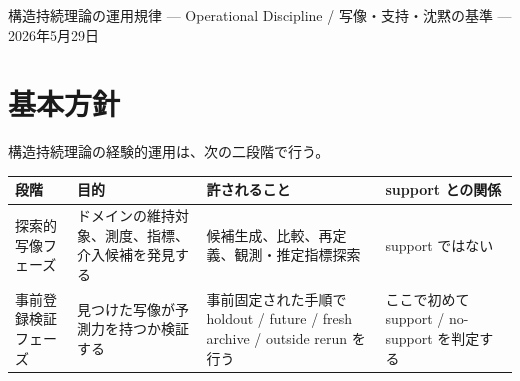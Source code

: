 \documentclass[12pt,a4paper]{article}
\begin{document}
\PaperTitleBlock
  {構造持続理論の運用規律}
  {— Operational Discipline / 写像・支持・沈黙の基準 —}
  {2026年5月29日}

\begin{abstract}
本補論は、構造持続理論を現実ドメインへ適用するときの運用規律をまとめる。中心にあるのは、理論核と写像発見を分けることである。理論核は、事前固定された構造維持問題に対する会計的・代数的制約である。一方、現実ドメインでは、維持対象、構造粒度、測度、段階損失指標、修復指標を探索的に発見する段階がある。この探索は許される。しかし、その同じ探索データ上の説明を support と呼んではならない。

Support と呼べるのは、写像・特徴量・baseline・metric・split・実行手順を凍結した後、holdout / future / fresh archive / outside rerun で、事前に定めた基準を満たした場合に限る。この補論は、その判定語彙を明示する。
\end{abstract}

\section{基本方針}\label{ux57faux672cux65b9ux91dd}

構造持続理論の経験的運用は、次の二段階で行う。

{\def\LTcaptype{table} %
\begin{longtable}[]{@{}
  >{\raggedright\arraybackslash}p{}
  >{\raggedright\arraybackslash}p{}
  >{\raggedright\arraybackslash}p{}
  >{\raggedright\arraybackslash}p{}@{}}
\toprule\noalign{}
\begin{minipage}[b]{\linewidth}\raggedright
段階
\end{minipage} & \begin{minipage}[b]{\linewidth}\raggedright
目的
\end{minipage} & \begin{minipage}[b]{\linewidth}\raggedright
許されること
\end{minipage} & \begin{minipage}[b]{\linewidth}\raggedright
support との関係
\end{minipage} \\
\midrule\noalign{}
\endhead
\bottomrule\noalign{}
\endlastfoot
探索的写像フェーズ & ドメインの維持対象、測度、指標、介入候補を発見する & 候補生成、比較、再定義、観測・推定指標探索 & support ではない \\
事前登録検証フェーズ & 見つけた写像が予測力を持つか検証する & 事前固定された手順で holdout / future / fresh archive / outside rerun を行う & ここで初めて support / no-support を判定する \\
\end{longtable}
}
\end{document}
